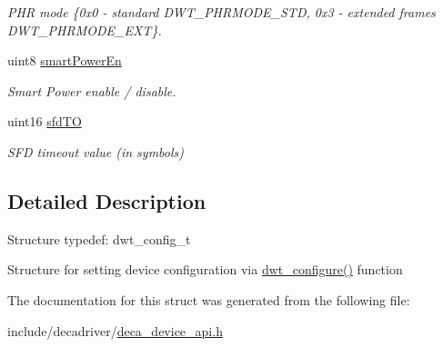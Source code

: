 \begin{DoxyCompactItemize}
\begin{DoxyCompactList}\small\item\em P\-H\-R mode \{0x0 -\/ standard D\-W\-T\-\_\-\-P\-H\-R\-M\-O\-D\-E\-\_\-\-S\-T\-D, 0x3 -\/ extended frames D\-W\-T\-\_\-\-P\-H\-R\-M\-O\-D\-E\-\_\-\-E\-X\-T\}. \end{DoxyCompactList}\item 
\hypertarget{struct____attribute_____a395612f0a1ca0a827a8a508686fb1c9e}{uint8 \hyperlink{struct____attribute_____a395612f0a1ca0a827a8a508686fb1c9e}{smart\-Power\-En}}\label{struct____attribute_____a395612f0a1ca0a827a8a508686fb1c9e}

\begin{DoxyCompactList}\small\item\em Smart Power enable / disable. \end{DoxyCompactList}\item 
\hypertarget{struct____attribute_____a0264a31131e7f316b4d18d7df86272a3}{uint16 \hyperlink{struct____attribute_____a0264a31131e7f316b4d18d7df86272a3}{sfd\-T\-O}}\label{struct____attribute_____a0264a31131e7f316b4d18d7df86272a3}

\begin{DoxyCompactList}\small\item\em S\-F\-D timeout value (in symbols) \end{DoxyCompactList}\end{DoxyCompactItemize}


\subsection{Detailed Description}


 Structure typedef\-: dwt\-\_\-config\-\_\-t

Structure for setting device configuration via \hyperlink{deca__device__api_8h_a57a54d1f32522d3824637c8ab17fb426}{dwt\-\_\-configure()} function 

The documentation for this struct was generated from the following file\-:\begin{DoxyCompactItemize}
\item 
include/decadriver/\hyperlink{deca__device__api_8h}{deca\-\_\-device\-\_\-api.\-h}\end{DoxyCompactItemize}
